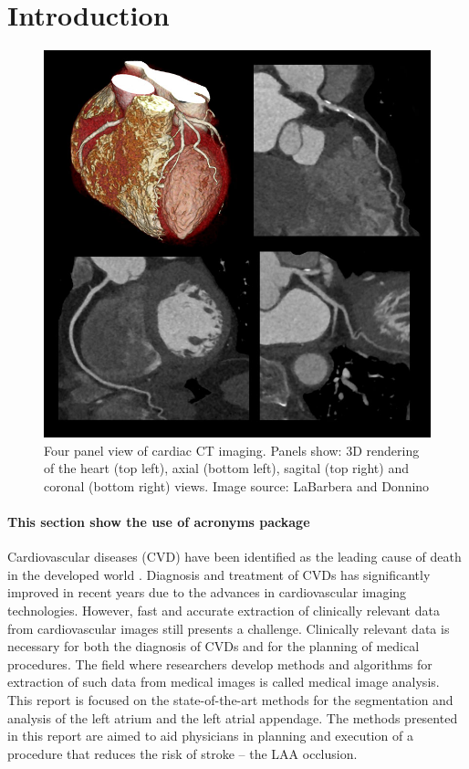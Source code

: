\section{Introduction}
\label{sec:introduction}

\begin{figure}[tb]
  \centering
  \includegraphics[width=0.7\linewidth]{gfx/my_images/intro_ct.jpg}
  \caption[Four panel view of cardiac CT]{
    Four panel view of cardiac CT imaging. Panels show: 3D rendering of the heart 
    (top left), axial (bottom left), sagital (top right) and coronal (bottom right)
    views. 
  Image source: LaBarbera and Donnino \cite{labarberra2008_NoninvasiveCardiacImaging}}
  \label{fig:intro_ct}
\end{figure}





\paragraph{This section show the use of acronyms package}
Cardiovascular diseases (\acs{CVD}) have been identified as the leading cause
of death in the developed world
\cite{nichols2012_Europeancardiovasculardisease,worldhealthorganization2017_top10causes}.
Diagnosis and treatment of \acp{CVD} has significantly improved in recent years
due to the advances in cardiovascular imaging technologies. However, fast and
accurate extraction of clinically relevant data from cardiovascular images
still presents a challenge. Clinically relevant data is necessary for both the
diagnosis of \acp{CVD} and for the planning of medical procedures. The field
where researchers develop methods and algorithms for extraction of such data
from medical images is called medical image analysis.  This report is focused
on the state-of-the-art methods for the segmentation and analysis of the left
atrium and the left atrial appendage.  The methods presented in this report are
aimed to aid physicians in planning and execution of a procedure that reduces
the risk of stroke -- the \acf{LAA} occlusion. 



